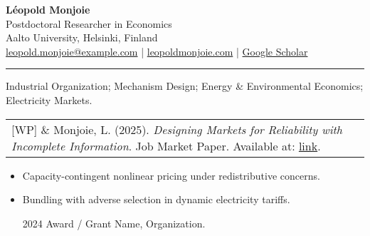 \documentclass[11pt,a4paper]{article}
\begin{document}
{\Large \textbf{L\'eopold Monjoie}}\\[2pt]
Postdoctoral Researcher in Economics\\
Aalto University, Helsinki, Finland\\
\href{mailto:leopold.monjoie@example.com}{leopold.monjoie@example.com} \;|\; \href{https://leopoldmonjoie.com}{leopoldmonjoie.com} \;|\; \href{https://scholar.google.com/}{Google Scholar}

\vspace{0.6em}\hrule\vspace{0.8em}

Industrial Organization; Mechanism Design; Energy  \&  Environmental Economics; Electricity Markets.



\begin{longtable}{@{}p{1cm}p{14cm}@{}}
[WP] \& Monjoie, L. (2025). \emph{Designing Markets for Reliability with Incomplete Information}. Job Market Paper. Available at: \href{https://leopoldmonjoie.com/files/monjoie_jmp.pdf}{link}. \\
\end{longtable}

\begin{itemize}
  \item Capacity-contingent nonlinear pricing under redistributive concerns.
  \item Bundling with adverse selection in dynamic electricity tariffs.
\end{itemize}

\begin{itemize}
  \item [2024] Award / Grant Name, Organization.
\end{itemize}
\end{document}
